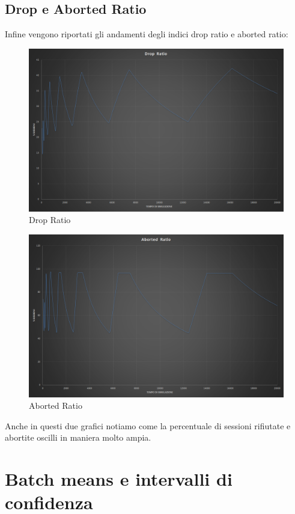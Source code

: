 \subsection{Drop e Aborted Ratio}
Infine vengono riportati gli andamenti degli indici drop ratio e aborted ratio:
\begin{figure}[H]
 \centering
 \includegraphics[scale=0.4]{img/dropRatio.png}
 \caption[Drop Ratio]{Drop Ratio}
 \label{fig:Drop Ratio}
\end{figure}
\begin{figure}[H]
 \centering
 \includegraphics[scale=0.4]{img/abortRatio.png}
 \caption[Aborted Ratio]{Aborted Ratio}
 \label{fig:Aborted Ratio}
\end{figure}
Anche in questi due grafici notiamo come la percentuale di sessioni rifiutate e abortite
oscilli in maniera molto ampia.
\section{Batch means e intervalli di confidenza}

